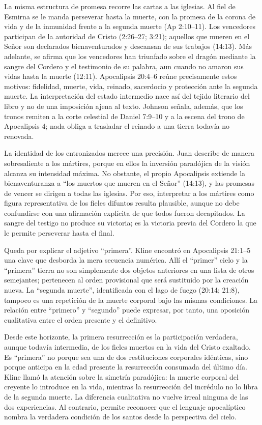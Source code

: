 La misma estructura de promesa recorre las cartas a las iglesias.
Al fiel de Esmirna se le manda perseverar hasta la muerte, con la promesa de la corona de vida y de la inmunidad frente a la segunda muerte (Ap 2:10--11).
Los vencedores participan de la autoridad de Cristo (2:26--27; 3:21); aquellos que mueren en el Señor son declarados bienaventurados y descansan de sus trabajos (14:13).
Más adelante, se afirma que los vencedores han triunfado sobre el dragón mediante la sangre del Cordero y el testimonio de su palabra, aun cuando no amaron sus vidas hasta la muerte (12:11).
Apocalipsis 20:4--6 reúne precisamente estos motivos: fidelidad, muerte, vida, reinado, sacerdocio y protección ante la segunda muerte.
La interpretación del estado intermedio nace así del tejido literario del libro y no de una imposición ajena al texto.
Johnson señala, además, que los tronos remiten a la corte celestial de Daniel 7:9--10 y a la escena del trono de Apocalipsis 4; nada obliga a trasladar el reinado a una tierra todavía no renovada. \autocite{johnson2024}

La identidad de los entronizados merece una precisión.
Juan describe de manera sobresaliente a los mártires, porque en ellos la inversión paradójica de la visión alcanza su intensidad máxima.
No obstante, el propio Apocalipsis extiende la bienaventuranza a \enquote{los muertos que mueren en el Señor} (14:13), y las promesas de vencer se dirigen a todas las iglesias.
Por eso, interpretar a los mártires como figura representativa de los fieles difuntos resulta plausible, aunque no debe confundirse con una afirmación explícita de que todos fueron decapitados.
La sangre del testigo no produce su victoria; es la victoria previa del Cordero la que le permite perseverar hasta el final.

Queda por explicar el adjetivo \enquote{primera}.
Kline encontró en Apocalipsis 21:1--5 una clave que desborda la mera secuencia numérica.
Allí el \enquote{primer} cielo y la \enquote{primera} tierra no son simplemente dos objetos anteriores en una lista de otros semejantes; pertenecen al orden provisional que será sustituido por la creación nueva.
La \enquote{segunda muerte}, identificada con el lago de fuego (20:14; 21:8), tampoco es una repetición de la muerte corporal bajo las mismas condiciones.
La relación entre \enquote{primero} y \enquote{segundo} puede expresar, por tanto, una oposición cualitativa entre el orden presente y el definitivo. \autocite[366--370]{kline1975}

Desde este horizonte, la primera resurrección es la participación verdadera, aunque todavía intermedia, de los fieles muertos en la vida del Cristo exaltado.
Es \enquote{primera} no porque sea una de dos restituciones corporales idénticas, sino porque anticipa en la edad presente la resurrección consumada del último día.
Kline llamó la atención sobre la simetría paradójica: la muerte corporal del creyente lo introduce en la vida, mientras la resurrección del incrédulo no lo libra de la segunda muerte.
La diferencia cualitativa no vuelve irreal ninguna de las dos experiencias.
Al contrario, permite reconocer que el lenguaje apocalíptico nombra la verdadera condición de los santos desde la perspectiva del cielo.

